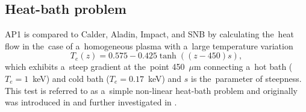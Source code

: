 \documentclass[
 aps,
 jmp,
 amsmath,amssymb,
 twocolumn,
]{revtex4-1}
\begin{document}
\subsection{Heat-bath problem}  
\label{sec:heatbath_test}
AP1 is compared to Calder, Aladin, Impact, and SNB by 
calculating the~heat flow in the~case of a~homogeneous plasma
with a~large temperature variation
\begin{equation}
  T_e(z) = 0.575 - 0.425 \tanh\left((z-450) s\right) ,
  \label{eq:T_init}
\end{equation}
which exhibits a~steep gradient at the~point 450~$\mu$m 
connecting a~hot bath ($T_e = 1$~keV) 
and cold bath ($T_e = 0.17$~keV) and $s$ is the~parameter of steepness. 
This test is referred to as a~simple non-linear heat-bath problem and
originally was introduced in \cite{marocchino2013} and further investigated
in  \cite{Sorbo_2015, Sorbo_2016, Sherlock_PoP2017, Brodrick_PoP2017}.
\end{document}
